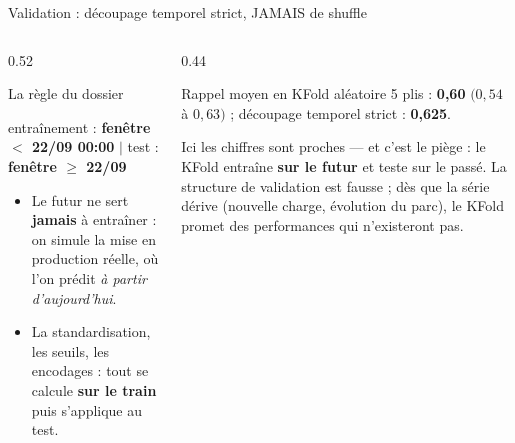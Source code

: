 \begin{frame}{Validation : découpage temporel strict, JAMAIS de shuffle}
\begin{columns}[t]
\begin{column}{0.52\textwidth}
\begin{block}{La règle du dossier}
\begin{center}
\footnotesize entraînement : \textbf{fenêtre $<$ 22/09 00:00} \quad
$\Big|$ \quad test : \textbf{fenêtre $\ge$ 22/09}
\end{center}
\begin{itemize}
\item Le futur ne sert \textbf{jamais} à entraîner : on simule la mise
en production réelle, où l'on prédit \emph{à partir d'aujourd'hui}.
\item La standardisation, les seuils, les encodages : tout se calcule
\textbf{sur le train} puis s'applique au test.
\end{itemize}
\end{block}
\end{column}
\begin{column}{0.44\textwidth}
\begin{ebox}
\small Rappel moyen en KFold aléatoire 5 plis : \textbf{0,60}
$(0{,}54$ à $0{,}63)$ ; découpage temporel strict : \textbf{0,625}.
\end{ebox}
\begin{wbox}
\small
Ici les chiffres sont proches --- et c'est le piège : le KFold entraîne
\textbf{sur le futur} et teste sur le passé. La structure de validation
est fausse ; dès que la série dérive (nouvelle charge, évolution du
parc), le KFold promet des performances qui n'existeront pas.
\end{wbox}
\end{column}
\end{columns}
\end{frame}

